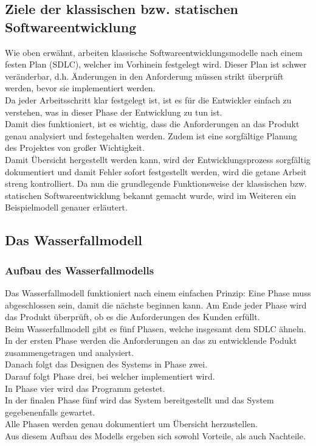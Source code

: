 \documentclass[a4paper, 10pt]{scrartcl}
\begin{document}
\subsection{Ziele der klassischen bzw. statischen Softwareentwicklung}
Wie oben erwähnt, arbeiten klassische Softwareentwicklungsmodelle nach einem festen Plan (SDLC), welcher im Vorhinein festgelegt wird. Dieser Plan ist schwer veränderbar, d.h. Änderungen in den Anforderung müssen strikt überprüft werden, bevor sie implementiert werden.\\
Da jeder Arbeitsschritt klar festgelegt ist, ist es für die Entwickler einfach zu verstehen, was in dieser Phase der Entwicklung zu tun ist.\\
Damit dies funktioniert, ist es wichtig, dass die Anforderungen an das Produkt genau analysiert und festegehalten werden. Zudem ist eine sorgfältige Planung des Projektes von großer Wichtigkeit.\\
Damit Übersicht hergestellt werden kann, wird der Entwicklungsprozess sorgfältig dokumentiert und damit Fehler sofort festgestellt werden, wird die getane Arbeit streng kontrolliert. \citep{stoica}
Da nun die grundlegende Funktionsweise der klassischen bzw. statischen Softwareentwicklung bekannt gemacht wurde, wird im Weiteren ein Beispielmodell genauer erläutert.

\subsection{Das Wasserfallmodell} \label{Wasserfallmodell}
\subsubsection{Aufbau des Wasserfallmodells}
Das Wasserfallmodell funktioniert nach einem einfachen Prinzip: Eine Phase muss abgeschlossen sein, damit die nächste beginnen kann. Am Ende jeder Phase wird das Produkt überprüft, ob es die Anforderungen des Kunden erfüllt.\\
Beim Wasserfallmodell gibt es fünf Phasen, welche insgesamt dem SDLC ähneln.\\
In der ersten Phase werden die Anforderungen an das zu entwicklende Podukt zusammengetragen und analysiert.\\
Danach folgt das Designen des Systems in Phase zwei.\\
Darauf folgt Phase drei, bei welcher implementiert wird.\\
In Phase vier wird das Programm getestet.\\
In der finalen Phase fünf wird das System bereitgestellt und das System gegebenenfalls gewartet.\\
Alle Phasen werden genau dokumentiert um Übersicht herzustellen. \citep{stoica}\\
Aus diesem Aufbau des Modells ergeben sich sowohl Vorteile, als auch Nachteile.
\end{document}
